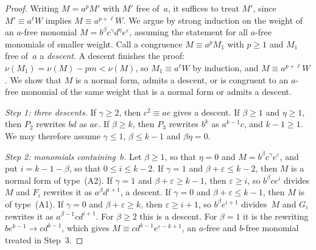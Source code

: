 \documentclass[11pt,letterpaper]{article}
\numberwithin{equation}{section}
\theoremstyle{plain}
\theoremstyle{remark}
\begin{document}
\begin{proof}
Writing $M=a^pM'$ with $M'$ free of~$a$, it suffices to treat $M'$, since $M'\equiv a^{\ell}W$ implies $M\equiv a^{p+\ell}W$. We argue by strong induction on the weight of an $a$-free monomial $M=b^{\beta}c^{\gamma}d^{\eta}e^{\varepsilon}$, assuming the statement for all $a$-free monomials of smaller weight. Call a congruence $M\equiv a^pM_1$ with $p\ge 1$ and $M_1$ free of~$a$ a \emph{descent}. A descent finishes the proof: $\nu(M_1)=\nu(M)-pm<\nu(M)$, so $M_1\equiv a^{\ell}W$ by induction, and $M\equiv a^{p+\ell}W$. We show that $M$ is a normal form, admits a descent, or is congruent to an $a$-free monomial of the same weight that is a normal form or admits a descent.

\emph{Step 1: three descents.} If $\gamma\ge 2$, then $c^2\equiv ae$ gives a descent. If $\beta\ge 1$ and $\eta\ge 1$, then $P_2$ rewrites $bd$ as $ae$. If $\beta\ge k$, then $P_3$ rewrites $b^k$ as $a^{k-1}c$, and $k-1\ge 1$. We may therefore assume $\gamma\le 1$, $\beta\le k-1$ and $\beta\eta=0$.

\emph{Step 2: monomials containing~$b$.} Let $\beta\ge 1$, so that $\eta=0$ and $M=b^{\beta}c^{\gamma}e^{\varepsilon}$, and put $i=k-1-\beta$, so that $0\le i\le k-2$. If $\gamma=1$ and $\beta+\varepsilon\le k-2$, then $M$ is a normal form of type~(A2). If $\gamma=1$ and $\beta+\varepsilon\ge k-1$, then $\varepsilon\ge i$, so $b^{\beta}ce^{i}$ divides $M$ and $F_i$ rewrites it as $a^{\beta}d^{i+1}$, a descent. If $\gamma=0$ and $\beta+\varepsilon\le k-1$, then $M$ is of type~(A1). If $\gamma=0$ and $\beta+\varepsilon\ge k$, then $\varepsilon\ge i+1$, so $b^{\beta}e^{i+1}$ divides~$M$ and $G_i$ rewrites it as $a^{\beta-1}cd^{i+1}$. For $\beta\ge 2$ this is a descent. For $\beta=1$ it is the rewriting $be^{k-1}\to cd^{k-1}$, which gives $M\equiv cd^{k-1}e^{\varepsilon-k+1}$, an $a$-free and $b$-free monomial treated in Step~3.


\end{proof}
\end{document}
